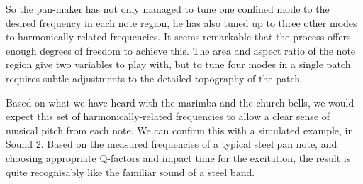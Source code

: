 

  So the pan-maker has not only managed to tune one confined mode to the 
  desired frequency in each note region, he has also tuned up to three other 
  modes to harmonically-related frequencies. It seems remarkable that the 
  process offers enough degrees of freedom to achieve this. The area and aspect 
  ratio of the note region give two variables to play with, but to tune four 
  modes in a single patch requires subtle adjustments to the detailed 
  topography of the patch. 

  Based on what we have heard with the marimba and the church bells, we would 
  expect this set of harmonically-related frequencies to allow a clear sense of 
  musical pitch from each note. We can confirm this with a simulated example, 
  in Sound 2. Based on the measured frequencies of a typical steel pan note, 
  and choosing appropriate Q-factors and impact time for the excitation, the 
  result is quite recognisably like the familiar sound of a steel band. 


